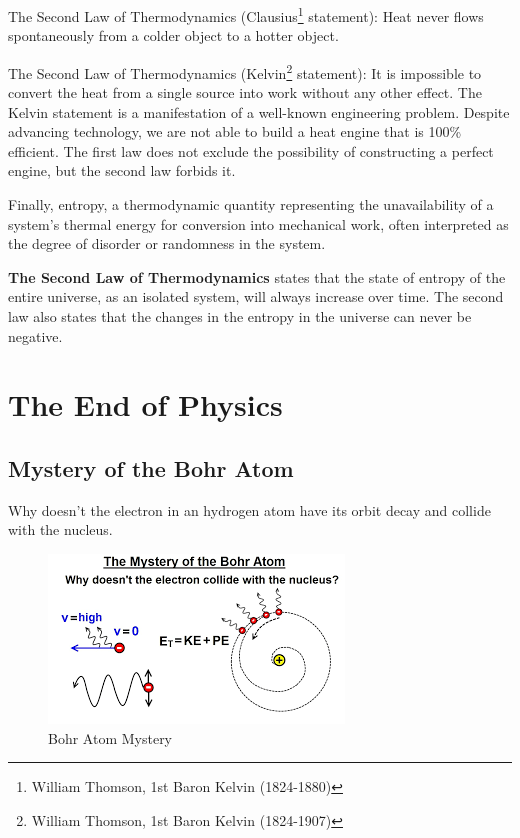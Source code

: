 \documentclass[14pt]{memoir}
\begin{document}
The Second Law of Thermodynamics (Clausius\footnote{William Thomson, 1st Baron Kelvin (1824-1880)} statement): Heat never flows spontaneously from a colder object to a hotter object.


The Second Law of Thermodynamics (Kelvin\footnote{William Thomson, 1st Baron Kelvin (1824-1907)} statement): It is impossible to convert the heat from a single source into work without any other effect. The Kelvin statement is a manifestation of a well-known engineering problem. Despite advancing technology, we are not able to build a heat engine that is  100\%  efficient. The first law does not exclude the possibility of constructing a perfect engine, but the second law forbids it.

Finally, entropy, a thermodynamic quantity representing the unavailability of a system's thermal energy for conversion into mechanical work, often interpreted as the degree of disorder or randomness in the system.

\textbf{The Second Law of Thermodynamics} states that the state of entropy of the entire universe, as an isolated system, will always increase over time. The second law also states that the changes in the entropy in the universe can never be negative.


\chapter{The End of Physics}

\section{Mystery of the Bohr Atom}

Why doesn't the electron in an hydrogen atom have its orbit decay and collide with the nucleus.

\begin{figure}[H]
\begin{center}
\includegraphics[scale=.6]{fig/bohrmystery.png}
\caption{Bohr Atom Mystery}
\label{fig:bm}
\end{center}
\end{figure} 
\end{document}
